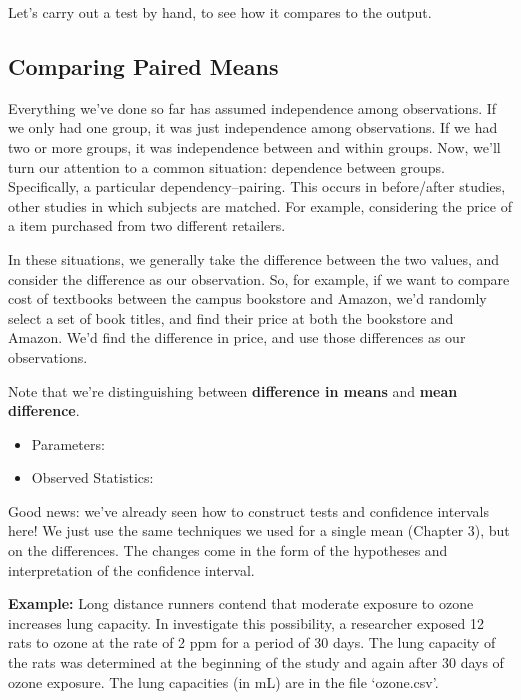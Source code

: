 \documentclass[
  letterpaper,
  DIV=11,
  numbers=noendperiod]{scrartcl}
\providecommand{\tightlist}{%
  \setlength{\itemsep}{0pt}\setlength{\parskip}{0pt}}\usepackage{longtable,booktabs,array}
\begin{document}
Let's carry out a test by hand, to see how it compares to the output.

\hfill\break
\hfill\break
\hfill\break
\hfill\break

\newpage

\subsection{Comparing Paired Means}\label{comparing-paired-means}

Everything we've done so far has assumed independence among
observations. If we only had one group, it was just independence among
observations. If we had two or more groups, it was independence between
and within groups. Now, we'll turn our attention to a common situation:
dependence between groups. Specifically, a particular
dependency--pairing. This occurs in before/after studies, other studies
in which subjects are matched. For example, considering the price of a
item purchased from two different retailers.

In these situations, we generally take the difference between the two
values, and consider the difference as our observation. So, for example,
if we want to compare cost of textbooks between the campus bookstore and
Amazon, we'd randomly select a set of book titles, and find their price
at both the bookstore and Amazon. We'd find the difference in price, and
use those differences as our observations.

Note that we're distinguishing between \textbf{difference in means} and
\textbf{mean difference}.

\begin{itemize}
\tightlist
\item
  Parameters:
\end{itemize}

\hfill\break

\begin{itemize}
\tightlist
\item
  Observed Statistics:
\end{itemize}

\hfill\break

Good news: we've already seen how to construct tests and confidence
intervals here! We just use the same techniques we used for a single
mean (Chapter 3), but on the differences. The changes come in the form
of the hypotheses and interpretation of the confidence interval.

\textbf{Example:} Long distance runners contend that moderate exposure
to ozone increases lung capacity. In investigate this possibility, a
researcher exposed 12 rats to ozone at the rate of 2 ppm for a period of
30 days. The lung capacity of the rats was determined at the beginning
of the study and again after 30 days of ozone exposure. The lung
capacities (in mL) are in the file `ozone.csv'.
\end{document}
